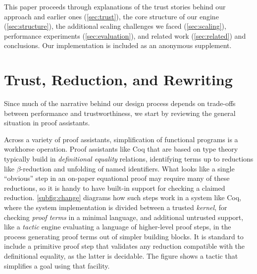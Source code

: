 This paper proceeds through explanations of the trust stories behind our approach and earlier ones (\autoref{sec:trust}), the core structure of our engine (\autoref{sec:structure}), the additional scaling challenges we faced (\autoref{sec:scaling}), performance experiments (\autoref{sec:evaluation}), and related work (\autoref{sec:related}) and conclusions.
Our implementation is included as an anonymous supplement.


\section{Trust, Reduction, and Rewriting} \label{sec:trust}

Since much of the narrative behind our design process depends on trade-offs between performance and trustworthiness, we start by reviewing the general situation in proof assistants.

Across a variety of proof assistants, simplification of functional programs is a workhorse operation.
Proof assistants like Coq that are based on type theory typically build in \emph{definitional equality} relations, identifying terms up to reductions like $\beta$-reduction and unfolding of named identifiers.
What looks like a single ``obvious'' step in an on-paper equational proof may require many of these reductions, so it is handy to have built-in support for checking a claimed reduction.
\autoref{subfig:change} diagrams how such steps work in a system like Coq, where the system implementation is divided between a trusted \emph{kernel}, for checking \emph{proof terms} in a minimal language, and additional untrusted support, like a \emph{tactic} engine evaluating a language of higher-level proof steps, in the process generating proof terms out of simpler building blocks.
It is standard to include a primitive proof step that validates any reduction compatible with the definitional equality, as the latter is decidable.
The figure shows a tactic that simplifies a goal using that facility.

